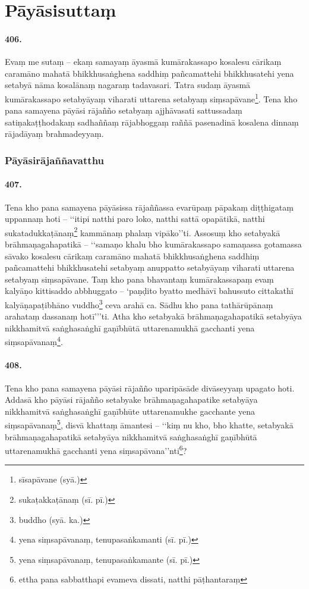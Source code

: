 \section{Pāyāsisuttaṃ}

\paragraph{406.} Evaṃ me sutaṃ – ekaṃ samayaṃ āyasmā kumārakassapo kosalesu cārikaṃ caramāno mahatā bhikkhusaṅghena saddhiṃ pañcamattehi bhikkhusatehi yena setabyā nāma kosalānaṃ nagaraṃ tadavasari. Tatra sudaṃ āyasmā kumārakassapo setabyāyaṃ viharati uttarena setabyaṃ siṃsapāvane\footnote{sīsapāvane (syā.)}. Tena kho pana samayena pāyāsi rājañño setabyaṃ ajjhāvasati sattussadaṃ satiṇakaṭṭhodakaṃ sadhaññaṃ rājabhoggaṃ raññā pasenadinā kosalena dinnaṃ rājadāyaṃ brahmadeyyaṃ.

\subsubsection{Pāyāsirājaññavatthu}

\paragraph{407.} Tena kho pana samayena pāyāsissa rājaññassa evarūpaṃ pāpakaṃ diṭṭhigataṃ uppannaṃ hoti – ‘‘itipi natthi paro loko, natthi sattā opapātikā, natthi sukatadukkaṭānaṃ\footnote{sukaṭakkaṭānaṃ (sī. pī.)} kammānaṃ phalaṃ vipāko’’ti. Assosuṃ kho setabyakā brāhmaṇagahapatikā – ‘‘samaṇo khalu bho kumārakassapo samaṇassa gotamassa sāvako kosalesu cārikaṃ caramāno mahatā bhikkhusaṅghena saddhiṃ pañcamattehi bhikkhusatehi setabyaṃ anuppatto setabyāyaṃ viharati uttarena setabyaṃ siṃsapāvane. Taṃ kho pana bhavantaṃ kumārakassapaṃ evaṃ kalyāṇo kittisaddo abbhuggato – ‘paṇḍito byatto medhāvī bahussuto cittakathī kalyāṇapaṭibhāno vuddho\footnote{buddho (syā. ka.)} ceva arahā ca. Sādhu kho pana tathārūpānaṃ arahataṃ dassanaṃ hotī’’’ti. Atha kho setabyakā brāhmaṇagahapatikā setabyāya nikkhamitvā saṅghasaṅghī gaṇībhūtā uttarenamukhā gacchanti yena siṃsapāvanaṃ\footnote{yena siṃsapāvanaṃ, tenupasaṅkamanti (sī. pī.)}.

\paragraph{408.} Tena kho pana samayena pāyāsi rājañño uparipāsāde divāseyyaṃ upagato hoti. Addasā kho pāyāsi rājañño setabyake brāhmaṇagahapatike setabyāya nikkhamitvā saṅghasaṅghī gaṇībhūte uttarenamukhe gacchante yena siṃsapāvanaṃ\footnote{yena siṃsapāvanaṃ, tenupasaṅkamante (sī. pī.)}, disvā khattaṃ āmantesi – ‘‘kiṃ nu kho, bho khatte, setabyakā brāhmaṇagahapatikā setabyāya nikkhamitvā saṅghasaṅghī gaṇībhūtā uttarenamukhā gacchanti yena siṃsapāvana’’nti\footnote{ettha pana sabbatthapi evameva dissati, natthi pāṭhantaraṃ}?

